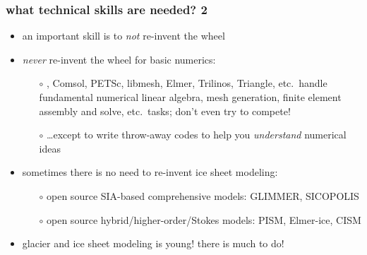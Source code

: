 \begin{frame}
\frametitle{what technical skills are needed? 2}

\begin{itemize}
\item an important skill is to \emph{not} re-invent the wheel
\item \emph{never} re-invent the wheel for basic numerics:
  \begin{itemize}
  \item[$\circ$] \Matlab, Comsol, PETSc, libmesh, Elmer, Trilinos, Triangle, etc.~handle fundamental numerical linear algebra, mesh generation, finite element assembly and solve, etc.~tasks; don't even try to compete!
  \item[$\circ$] \dots except to write throw-away codes to help you \emph{understand} numerical ideas 
  \end{itemize}
\item sometimes there is no need to re-invent ice sheet modeling:
  \begin{itemize}
  \item[$\circ$] open source SIA-based comprehensive models: GLIMMER, SICOPOLIS
  \item[$\circ$] open source hybrid/higher-order/Stokes models: PISM, Elmer-ice, CISM
  \end{itemize}
\item glacier and ice sheet modeling is young!  there is much to do!
\end{itemize}
\end{frame}
